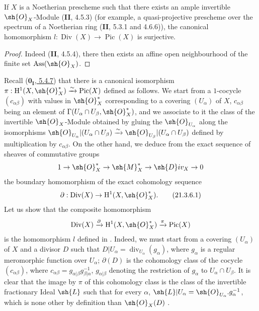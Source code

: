 \begin{corollary}[21.3.5]
\label{IV.21.3.5}
If $X$ is a Noetherian prescheme such that there exists an ample invertible $\sh{O}_X$-Module (\textbf{II}, 4.5.3) (for example, a quasi-projective prescheme over the spectrum of a Noetherian ring (\textbf{II}, 5.3.1 and 4.6.6)), the canonical homomorphism $l:\operatorname{Div}(X)\to\operatorname{Pic}(X)$ is surjective.
\end{corollary}

\begin{proof}
Indeed (\textbf{II}, 4.5.4), there then exists an affine open neighbourhood of the finite set $\operatorname{Ass}(\sh{O}_X)$.
\end{proof}


\begin{remark}[21.3.6]
\label{IV.21.3.6}
Recall (\hyperref[0.5.4.7]{$\mathbf{0_I}$, 5.4.7}) that there is a canonical isomorphism $\pi:\mathrm{H}^1(X,\sh{O}_X^*)\xrightarrow{\sim}\operatorname{Pic}(X)$ defined as follows.
We start from a $1$-cocycle $(c_{\alpha\beta})$ with values in $\sh{O}_X^*$ corresponding to a covering $(U_\alpha)$ of $X$, $c_{\alpha\beta}$ being an element of $\Gamma(U_\alpha\cap U_\beta,\sh{O}_X^*)$, and we associate to it the class of the invertible $\sh{O}_X$-Module obtained by gluing the $\sh{O}_{U_\alpha}$ along the isomorphisms $\sh{O}_{U_\alpha}|(U_\alpha\cap U_\beta)\xrightarrow{\sim}\sh{O}_{U_\beta}|(U_\alpha\cap U_\beta)$ defined by multiplication by $c_{\alpha\beta}$.
On the other hand, we deduce from the exact sequence of sheaves of commutative groups
\[
  1\to\sh{O}_X^*\to\sh{M}_X^*\to\sh{D}iv_X\to 0
\]
the boundary homomorphism of the exact cohomology sequence
\[
\label{IV.21.3.6.1}
  \partial:\operatorname{Div}(X)\to\mathrm{H}^1(X,\sh{O}_X^*).
  \tag{21.3.6.1}
\]
Let us show that the composite homomorphism
\[
  \operatorname{Div}(X)\xrightarrow{\partial}\mathrm{H}^1(X,\sh{O}_X^*)\xrightarrow{\pi}\operatorname{Pic}(X)
\]
is the homomorphism $l$ defined in .
Indeed, we must start from a covering $(U_\alpha)$ of $X$ and a divisor $D$ such that $D|U_\alpha=\operatorname{div}_{U_\alpha}(g_\alpha)$, where $g_\alpha$ is a regular meromorphic function over $U_\alpha$;
$\partial(D)$ is the cohomology class of the cocycle $(c_{\alpha\beta})$, where $c_{\alpha\beta}=g_{\alpha|\beta}g_{\beta|\alpha}^{-1}$, $g_{\alpha|\beta}$ denoting the restriction of $g_\alpha$ to $U_\alpha\cap U_\beta$.
It is clear that the image by $\pi$ of this cohomology class is the class of the invertible fractionary Ideal $\sh{L}$ such that for every $\alpha$, $\sh{L}|U_\alpha=\sh{O}_{U_\alpha}.g_\alpha^{-1}$, which is none other by definition than $\sh{O}_X(D)$ .
\end{remark}

